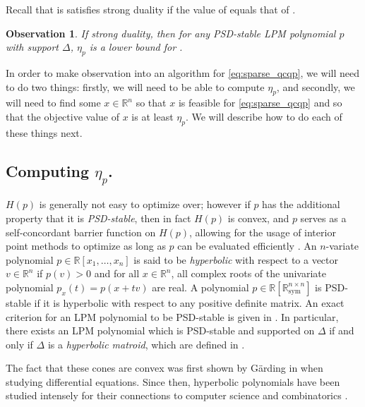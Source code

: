 \documentclass{amsart}
\newtheorem{observation}[theorem]{Observation}
\theoremstyle{definition}
\newcommand{\R}{\mathbb{R}}
\newcommand*{\Sym}{\R^{n \times n}_{\mathrm{sym}}}
\begin{document}
Recall that  is satisfies strong duality if the value of  equals that of .
\begin{observation}\label{obs:rel}
    If  strong duality, then for any PSD-stable LPM polynomial $p$ with support $\Delta$, $\eta_p$ is a lower bound for .
\end{observation}

In order to make observation  into an algorithm for \ref{eq:sparse_qcqp}, we will need to do two things: firstly, we will need to be able to compute $\eta_p$, and secondly, we will need to find some $x \in \R^n$ so that $x$ is feasible for \ref{eq:sparse_qcqp} and so that the objective value of $x$ is at least $\eta_p$. We will describe how to do each of these things next.

\subsection{Computing $\eta_p$.}

$H(p)$ is generally not easy to optimize over; however if $p$ has the additional property that it is \emph{PSD-stable}, then in fact $H(p)$ is convex, and $p$ serves as a self-concordant barrier function on $H(p)$, allowing for the usage of interior point methods to optimize as long as $p$ can be evaluated efficiently  \cite{TODO}.
An $n$-variate polynomial $p \in \R[x_1 ,\dots, x_n]$ is said to be \emph{hyperbolic} with respect to a vector $v \in \R^n$ if $p(v) > 0$ and for all $x \in \R^n$, all complex roots of the univariate polynomial $p_x(t) = p(x + tv)$ are real.
A polynomial $p \in \R[\Sym]$ is PSD-stable if it is hyperbolic with respect to any positive definite matrix.
An exact criterion for an LPM polynomial to be PSD-stable is given in \cite{TODO}.
In particular, there exists an LPM polynomial which is PSD-stable and supported on $\Delta$ if and only if $\Delta$ is a \emph{hyperbolic matroid}, which are defined in \cite{TODO}.

The fact that these cones are convex was first shown by G\"arding in \cite{TODO} when studying differential equations. Since then, hyperbolic polynomials have been studied intensely for their connections to computer science and combinatorics \cite{TODO}.
\end{document}
